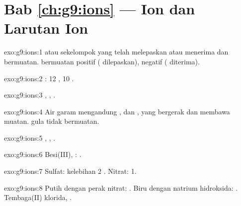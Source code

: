 \section*{Bab \ref{ch:g9:ions} --- Ion dan Larutan Ion}

\begin{solution}{exo:g9:ions:1}
 atau sekelompok  yang telah melepaskan atau menerima 
dan bermuatan.  bermuatan positif ( dilepaskan), 
negatif ( diterima).
\end{solution}

\begin{solution}{exo:g9:ions:2}
: 12 , 10 .
\end{solution}

\begin{solution}{exo:g9:ions:3}
, , .
\end{solution}

\begin{solution}{exo:g9:ions:4}
Air garam mengandung ,  dan , yang bergerak
dan membawa muatan.  gula tidak bermuatan.
\end{solution}

\begin{solution}{exo:g9:ions:5}
, , .
\end{solution}

\begin{solution}{exo:g9:ions:6}
Besi(III), : .
\end{solution}

\begin{solution}{exo:g9:ions:7}
Sulfat: kelebihan 2 . Nitrat: 1.
\end{solution}

\begin{solution}{exo:g9:ions:8}
Putih dengan perak nitrat: . Biru dengan natrium hidroksida:
. Tembaga(II) klorida, .
\end{solution}

